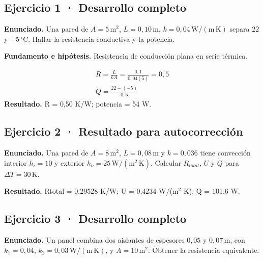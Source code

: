 \documentclass[11pt,a4paper]{article}
\begin{document}
\begin{center}\end{center}

\subsection*{Ejercicio 1 · Desarrollo completo}
\textbf{Enunciado.} Una pared de \(A=5\,\mathrm m^2\), \(L=0{,}10\,\mathrm m\), \(k=0{,}04\,\mathrm{W/(m\,K)}\) separa \(22\) y \(-5\,^\circ\mathrm C\). Hallar la resistencia conductiva y la potencia.

\textbf{Fundamento e hipótesis.} Resistencia de conducción plana en serie térmica.

\[
\begin{gathered}
R=\frac{L}{kA}=\frac{0{,}1}{0{,}04(5)}=0{,}5\\\dot Q=\frac{22-(-5)}{0{,}5}
\end{gathered}
\]
\textbf{Resultado.} R = 0,50 K/W; potencia = 54 W.


\subsection*{Ejercicio 2 · Resultado para autocorrección}
\textbf{Enunciado.} Una pared de \(A=8\,\mathrm m^2\), \(L=0{,}08\,\mathrm m\) y \(k=0{,}036\) tiene convección interior \(h_i=10\) y exterior \(h_o=25\,\mathrm{W/(m^2\,K)}\). Calcular \(R_{total}\), \(U\) y \(\dot Q\) para \(\Delta T=30\,\mathrm K\).

\textbf{Resultado.} Rtotal = 0,29528 K/W; U = 0,4234 W/(m\ensuremath{^2} K); Q̇ = 101,6 W.


\subsection*{Ejercicio 3 · Desarrollo completo}
\textbf{Enunciado.} Un panel combina dos aislantes de espesores \(0{,}05\) y \(0{,}07\,\mathrm m\), con \(k_1=0{,}04\), \(k_2=0{,}03\,\mathrm{W/(m\,K)}\), y \(A=10\,\mathrm m^2\). Obtener la resistencia equivalente.
\end{document}
